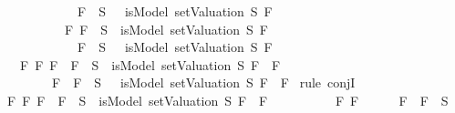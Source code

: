 \begin{isabellebody}
\ \ \ \ \ \ \ \ \ \ \ {\isacharparenleft}\isactrlbold {\isasymnot}\ F{}\ {\isasymin}\ S\ {\isasymlongrightarrow}\ {\isasymnot}\ isModel\ {\isacharparenleft}setValuation\ S{\isacharparenright}\ F{}{\isacharparenright}{\isachardoublequoteclose}\ \isanewline
\ \ \ \ \ \ \ \ \ \ {\isachardoublequoteopen}{\isasymAnd}F{}{\isachardot}\ {\isacharparenleft}F{}\ {\isasymin}\ S\ {\isasymlongrightarrow}\ isModel\ {\isacharparenleft}setValuation\ S{\isacharparenright}\ F{}{\isacharparenright}\ {\isasymand}\isanewline
\ \ \ \ \ \ \ \ \ \ \ {\isacharparenleft}\isactrlbold {\isasymnot}\ F{}\ {\isasymin}\ S\ {\isasymlongrightarrow}\ {\isasymnot}\ isModel\ {\isacharparenleft}setValuation\ S{\isacharparenright}\ F{}{\isacharparenright}{\isachardoublequoteclose}\isanewline
\ \ \ {\isachardoublequoteopen}{\isasymAnd}F{}\ F{}{\isachardot}\ {\isacharparenleft}F{}\ \isactrlbold {\isasymand}\ F{}\ {\isasymin}\ S\ {\isasymlongrightarrow}\ isModel\ {\isacharparenleft}setValuation\ S{\isacharparenright}\ {\isacharparenleft}F{}\ \isactrlbold {\isasymand}\ F{}{\isacharparenright}{\isacharparenright}\ {\isasymand}\isanewline
\ \ \ \ \ \ \ {\isacharparenleft}\isactrlbold {\isasymnot}\ {\isacharparenleft}F{}\ \isactrlbold {\isasymand}\ F{}{\isacharparenright}\ {\isasymin}\ S\ {\isasymlongrightarrow}\ {\isasymnot}\ isModel\ {\isacharparenleft}setValuation\ S{\isacharparenright}\ {\isacharparenleft}F{}\ \isactrlbold {\isasymand}\ F{}{\isacharparenright}{\isacharparenright}{\isachardoublequoteclose}\isanewline
%
\isadelimproof
%
\endisadelimproof
%
\isatagproof
{}\isamarkupfalse%
\ {\isacharparenleft}rule\ conjI{\isacharparenright}\isanewline
\ \ \isamarkupfalse%
\ {\isachardoublequoteopen}{\isasymAnd}F{}\ F{}{\isachardot}\ F{}\ \isactrlbold {\isasymand}\ F{}\ {\isasymin}\ S\ {\isasymlongrightarrow}\ isModel\ {\isacharparenleft}setValuation\ S{\isacharparenright}\ {\isacharparenleft}F{}\ \isactrlbold {\isasymand}\ F{}{\isacharparenright}{\isachardoublequoteclose}\isanewline
\ \ \isamarkupfalse%
\ \isanewline
\ \ \ \ \isamarkupfalse%
\ F{}\ F{}\isanewline
\ \ \ \ \isamarkupfalse%
\ {\isachardoublequoteopen}F{}\ \isactrlbold {\isasymand}\ F{}\ {\isasymin}\ S{\isachardoublequoteclose}\isanewline

\end{isabellebody}
